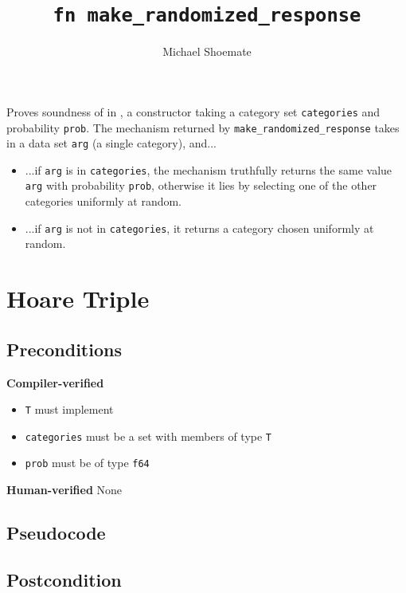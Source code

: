 \documentclass{article}
\title{\texttt{fn make\_randomized\_response}}
\author{Michael Shoemate}
\begin{document}
 
 
\maketitle 
 
Proves soundness of  in , 
a constructor taking a category set \texttt{categories} and probability \texttt{prob}. 
The mechanism returned by \texttt{make\_randomized\_response} takes in a data set \texttt{arg} (a single category), and... 
 
\begin{itemize} 
    \item ...if \texttt{arg} is in \texttt{categories}, 
    the mechanism truthfully returns the same value \texttt{arg} with probability \texttt{prob}, 
    otherwise it lies by selecting one of the other categories uniformly at random. 
    \item ...if \texttt{arg} is not in \texttt{categories},  
    it returns a category chosen uniformly at random. 
\end{itemize} 
 
\section{Hoare Triple} 
 
\subsection*{Preconditions} 
\textbf{Compiler-verified}
\begin{itemize} 
    \item \texttt{T} must implement  
    \item \texttt{categories} must be a set with members of type \texttt{T} 
    \item \texttt{prob} must be of type \texttt{f64} 
\end{itemize} 

\textbf{Human-verified}
None
 
\subsection*{Pseudocode} 
 
 
\subsection*{Postcondition} 
 
\end{document}
